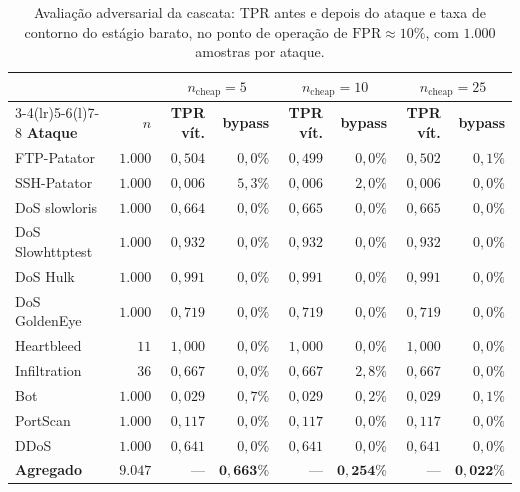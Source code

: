 \documentclass[conference]{IEEEtran}
\begin{document}
\begin{table}[!t]
\centering
\footnotesize
\setlength{\tabcolsep}{6pt}
\caption{Avaliação adversarial da cascata: TPR antes e depois do ataque e taxa de contorno do estágio barato, no ponto de operação de $\text{FPR} \approx 10\%$, com $1.000$ amostras por ataque.}
\label{tab:cascata_adv}
\begin{tabular}{@{}lrrrrrrr@{}}
\toprule
& & \multicolumn{2}{c}{\textbf{$n_{\text{cheap}} = 5$}} & \multicolumn{2}{c}{\textbf{$n_{\text{cheap}} = 10$}} & \multicolumn{2}{c}{\textbf{$n_{\text{cheap}} = 25$}} \\
\cmidrule(lr){3-4}\cmidrule(lr){5-6}\cmidrule(l){7-8}
\textbf{Ataque} & \textbf{$n$} & \textbf{TPR vít.} & \textbf{bypass} & \textbf{TPR vít.} & \textbf{bypass} & \textbf{TPR vít.} & \textbf{bypass} \\
\midrule
FTP-Patator & $1.000$ & $0{,}504$ & $0{,}0\%$ & $0{,}499$ & $0{,}0\%$ & $0{,}502$ & $0{,}1\%$ \\
SSH-Patator & $1.000$ & $0{,}006$ & $5{,}3\%$ & $0{,}006$ & $2{,}0\%$ & $0{,}006$ & $0{,}0\%$ \\
DoS slowloris & $1.000$ & $0{,}664$ & $0{,}0\%$ & $0{,}665$ & $0{,}0\%$ & $0{,}665$ & $0{,}0\%$ \\
DoS Slowhttptest & $1.000$ & $0{,}932$ & $0{,}0\%$ & $0{,}932$ & $0{,}0\%$ & $0{,}932$ & $0{,}0\%$ \\
DoS Hulk & $1.000$ & $0{,}991$ & $0{,}0\%$ & $0{,}991$ & $0{,}0\%$ & $0{,}991$ & $0{,}0\%$ \\
DoS GoldenEye & $1.000$ & $0{,}719$ & $0{,}0\%$ & $0{,}719$ & $0{,}0\%$ & $0{,}719$ & $0{,}0\%$ \\
Heartbleed & $11$ & $1{,}000$ & $0{,}0\%$ & $1{,}000$ & $0{,}0\%$ & $1{,}000$ & $0{,}0\%$ \\
Infiltration & $36$ & $0{,}667$ & $0{,}0\%$ & $0{,}667$ & $2{,}8\%$ & $0{,}667$ & $0{,}0\%$ \\
Bot & $1.000$ & $0{,}029$ & $0{,}7\%$ & $0{,}029$ & $0{,}2\%$ & $0{,}029$ & $0{,}1\%$ \\
PortScan & $1.000$ & $0{,}117$ & $0{,}0\%$ & $0{,}117$ & $0{,}0\%$ & $0{,}117$ & $0{,}0\%$ \\
DDoS & $1.000$ & $0{,}641$ & $0{,}0\%$ & $0{,}641$ & $0{,}0\%$ & $0{,}641$ & $0{,}0\%$ \\
\midrule
\textbf{Agregado} & $\mathbf{9.047}$ & --- & $\mathbf{0{,}663\%}$ & --- & $\mathbf{0{,}254\%}$ & --- & $\mathbf{0{,}022\%}$ \\
\bottomrule
\end{tabular}
\end{table}
\end{document}
